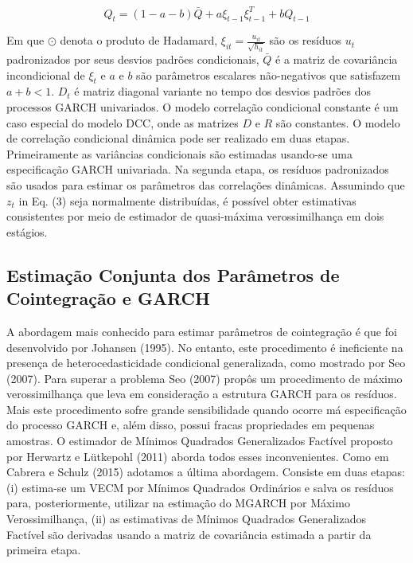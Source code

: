 \documentclass[a4paper,12pt] {article}
\begin{document}
   \begin{equation}
   Q_{t}=(1-a-b) \bar{Q} + a \xi_{t-1} \xi_{t-1}^T+bQ_{t-1}
   \end{equation}
   
 Em que $\odot$ denota o produto de Hadamard, $\xi_{it} =  \frac{u_{it}}{\sqrt{h_{it}}}$  são os resíduos $u_t$ padronizados  por seus desvios padrões condicionais, $\bar{Q}$ é a matriz de covariância incondicional de $\xi_{t}$ e $a$ e $b$ são parâmetros escalares não-negativos que satisfazem $a + b<1$. $D_t$ é matriz diagonal variante no tempo dos desvios padrões dos processos GARCH univariados. O modelo correlação condicional constante é um caso especial do modelo DCC, onde as matrizes $D$ e $R$ são constantes.
 O modelo de correlação condicional dinâmica pode ser realizado em duas etapas. Primeiramente as variâncias condicionais são estimadas usando-se uma especificação GARCH univariada. Na segunda etapa, os resíduos padronizados são usados para estimar os parâmetros das correlações dinâmicas.
 Assumindo que $z_t$ in Eq. (3) seja normalmente distribuídas, é possível obter estimativas consistentes por meio de estimador de quasi-máxima verossimilhança em dois estágios.  
 	
 \subsection{Estimação Conjunta dos Parâmetros de Cointegração e GARCH} 
 

	A abordagem mais conhecido para estimar parâmetros de cointegração é que foi desenvolvido por Johansen (1995). No entanto, este procedimento é ineficiente na presença de heterocedasticidade condicional generalizada, como mostrado por Seo (2007). Para superar a problema Seo (2007) propôs um procedimento de máximo verossimilhança que leva em consideração a estrutura GARCH para os resíduos. Mais este procedimento sofre grande sensibilidade quando ocorre má especificação do  processo GARCH e, além disso, possui fracas propriedades em pequenas amostras.  O estimador de Mínimos Quadrados Generalizados Factível proposto por Herwartz e Lütkepohl (2011) aborda todos esses inconvenientes. Como em  Cabrera e Schulz (2015) adotamos a última abordagem. Consiste em duas etapas: (i) estima-se um VECM por Mínimos Quadrados Ordinários e salva os resíduos  para,  posteriormente, utilizar na estimação do MGARCH por Máximo Verossimilhança, (ii) as estimativas de Mínimos Quadrados Generalizados Factível são derivadas usando a matriz de covariância estimada a partir da primeira etapa.
	
\end{document}
